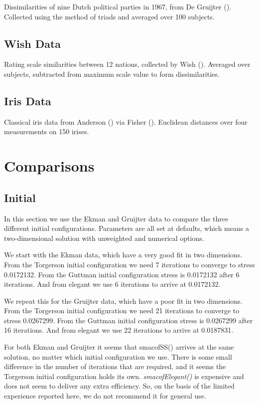 \documentclass[
  12pt,
  letterpaper,
  DIV=11,
  numbers=noendperiod]{scrartcl}
\begin{document}
Dissimilarities of nine Dutch political parties in 1967, from De
Gruijter (). Collected using the
method of triads and averaged over 100 subjects.

\subsection{Wish Data}\label{wish-data}

Rating scale similarities between 12 nations, collected by Wish
(). Averaged over subjects, subtracted from
maximum scale value to form dissimilarities.

\subsection{Iris Data}\label{iris-data}

Classical iris data from Anderson () via
Fisher (). Euclidean distances over four
measurements on 150 irises.

\section{Comparisons}\label{comparisons}

\subsection{Initial}\label{initial}

In this section we use the Ekman and Gruijter data to compare the three
different initial configurations. Parameters are all set at defaults,
which means a two-dimensional solution with unweighted and numerical
options.

We start with the Ekman data, which have a very good fit in two
dimensions. From the Torgerson initial configuration we need 7
iterations to converge to stress 0.0172132. From the Guttman initial
configuration stress is 0.0172132 after 6 iterations. And from elegant
we use 6 iterations to arrive at 0.0172132.

We repeat this for the Gruijter data, which have a poor fit in two
dimensions. From the Torgerson initial configuration we need 21
iterations to converge to stress 0.0267299. From the Guttman initial
configuration stress is 0.0267299 after 16 iterations. And from elegant
we use 22 iterations to arrive at 0.0187831.

For both Ekman and Gruijter it seems that smacofSS() arrives at the same
solution, no matter which initial configuration we use. There is some
small difference in the number of iterations that are required, and it
seems the Torgerson initial configuration holds its own.
\emph{smacofElegant()} is expensive and does not seem to deliver any
extra efficiency. So, on the basis of the limited experience reported
here, we do not recommend it for general use.
\end{document}
